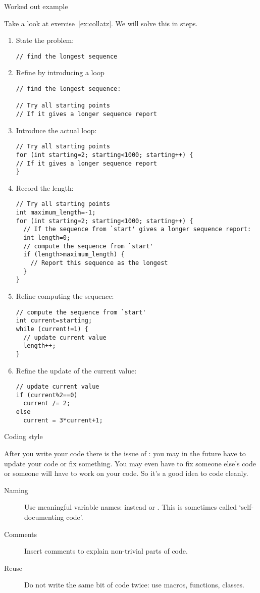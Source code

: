  {Worked out example}

Take a look at exercise~\ref{ex:collatz}. We will solve this in steps.
\begin{enumerate}
\item State the problem:
\begin{verbatim}
// find the longest sequence
\end{verbatim}
\item Refine by introducing a loop
\begin{verbatim}
// find the longest sequence:

// Try all starting points
// If it gives a longer sequence report
\end{verbatim}
\item Introduce the actual loop:
\begin{verbatim}
// Try all starting points
for (int starting=2; starting<1000; starting++) {
// If it gives a longer sequence report
}
\end{verbatim}
\item Record the length:
\begin{verbatim}
// Try all starting points
int maximum_length=-1;
for (int starting=2; starting<1000; starting++) {
  // If the sequence from `start' gives a longer sequence report:
  int length=0;
  // compute the sequence from `start'
  if (length>maximum_length) {
    // Report this sequence as the longest
  }
}
\end{verbatim}
\item Refine computing the sequence:
\begin{verbatim}
// compute the sequence from `start'
int current=starting;
while (current!=1) {
  // update current value
  length++;
}
\end{verbatim}
\item Refine the update of the current value:
\begin{verbatim}
// update current value
if (current%2==0)
  current /= 2;
else
  current = 3*current+1;
\end{verbatim}
\end{enumerate}

 {Coding style}

After you write your code there is the issue of
: you may in the future have to
update your code or fix something. You may even have to fix someone
else's code or someone will have to work on your code. So it's a good
idea to code cleanly.

\begin{description}
\item[Naming] Use meaningful variable names:  instead
   or . This is sometimes called `self-documenting code'.
\item[Comments] Insert comments to explain non-trivial parts of code.
\item[Reuse] Do not write the same bit of code twice: use macros,
  functions, classes.
\end{description}

